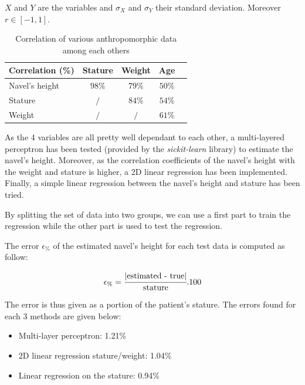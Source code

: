 \documentclass{article}
\newcommand{\vsp}{\vspace{\baselineskip}}
\begin{document}
$X$ and $Y$ are the variables and $\sigma_X$ and $\sigma_Y$ their standard deviation. Moreover $r \in [-1,1]$.

\begin{table}[H]
    \centering
    \begin{tabular}{|l|c|c|c|c|}
        \hline 
        Correlation (\%) & Stature & Weight & Age 
        \\ \hline
        Navel's height & $98\%$ & $79\%$ & $50\%$
        \\ \hline
        Stature & $/$ & $84\%$ & $54\%$
        \\ \hline
        Weight & $/$ & $/$ & $61\%$
        \\ \hline 
    \end{tabular}
    \caption{Correlation of various anthropomorphic data among each others}
    \label{tab:correlation_various_variables}
\end{table}

As the 4 variables are all pretty well dependant to each other, a multi-layered perceptron has been tested (provided by the \textit{sickit-learn} library) to estimate the navel's height. Moreover, as the correlation coefficients of the navel's height with the weight and stature is higher, a 2D linear regression has been implemented. Finally, a simple linear regression between the navel's height and stature has been tried. 

\vsp

By splitting the set of data into two groups, we can use a first part to train the regression while the other part is used to test the regression. 
\vsp

The error $\epsilon_\%$ of the estimated navel's height for each test data is computed as follow:

\begin{equation}
    \epsilon_\% = \cfrac{\abs{\text{estimated - true}}}{\text{stature}}.100
\end{equation}

The error is thus given as a portion of the patient's stature. The errors found for each 3 methods are given below:

\begin{itemize}
    \item Multi-layer perceptron: 1.21\% 
    \item 2D linear regression stature/weight: 1.04\% 
    \item Linear regression on the stature: 0.94\%
\end{itemize}
\end{document}
